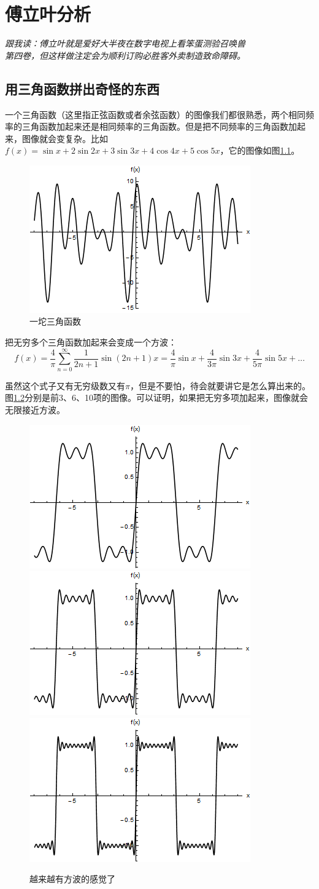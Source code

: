 \chapter{傅立叶分析}
\begin{flushright} \it 跟我读：傅立叶就是爱好大半夜在数字电视上看笨蛋测验召唤兽 \\ 第四卷，但这样做注定会为顺利订购必胜客外卖制造致命障碍。 \end{flushright}
\section{用三角函数拼出奇怪的东西}
一个三角函数（这里指正弦函数或者余弦函数）的图像我们都很熟悉，两个相同频率的三角函数加起来还是相同频率的三角函数。但是把不同频率的三角函数加起来，图像就会变复杂。比如$f(x)=\sin x+2 \sin 2 x+3 \sin 3 x+4 \cos 4 x+5 \cos 5 x$，它的图像如图\ref{fig-trigo-sum}。
\begin{figure}[htb]
\centering
\includegraphics[width=0.33\linewidth]{fig/trigo-sum.png}
\caption{一坨三角函数}
\label{fig-trigo-sum}
\end{figure}

把无穷多个三角函数加起来会变成一个方波：
\begin{equation*}
f(x)=\frac{4}{\pi} \sum_{n=0}^{\infty} \frac{1}{2 n+1} \sin (2 n+1) x=\frac{4}{\pi} \sin x+\frac{4}{3 \pi} \sin 3 x+\frac{4}{5 \pi} \sin 5 x+\dots
\end{equation*}

虽然这个式子又有无穷级数又有$\pi$，但是不要怕，待会就要讲它是怎么算出来的。图\ref{fig-trigo-square-wave}分别是前$3$、$6$、10项的图像。可以证明，如果把无穷多项加起来，图像就会无限接近方波。
\begin{figure}[htb]
\centering
\includegraphics[width=0.27\linewidth]{fig/trigo-square-wave.png}
\includegraphics[width=0.27\linewidth]{fig/trigo-square-wave-2.png}
\includegraphics[width=0.27\linewidth]{fig/trigo-square-wave-3.png}
\caption{越来越有方波的感觉了}
\label{fig-trigo-square-wave}
\end{figure}

